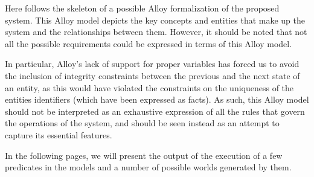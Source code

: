 Here follows the skeleton of a possible Alloy formalization of the proposed system.
This Alloy model depicts the key concepts and entities that make up the system and the relationships between them.
However, it should be noted that not all the possible requirements could be expressed in terms of this Alloy model.

In particular, Alloy's lack of support for proper variables has forced us to avoid the inclusion of integrity constraints between the previous and the next state of an entity, as this would have violated the constraints on the uniqueness of the entities identifiers (which have been expressed as facts). 
As such, this Alloy model should not be interpreted as an exhaustive expression of all the rules that govern the operations of the system, and should be seen instead as an attempt to capture its essential features.



In the following pages, we will present the output of the execution of a few predicates in the models and a number of possible worlds generated by them.
\begin{figure}[H]
\centering
{}
\end{figure}

\begin{landscape}
%
\end{landscape}

\begin{landscape}
%
\end{landscape}

\begin{landscape}
%
\end{landscape}

